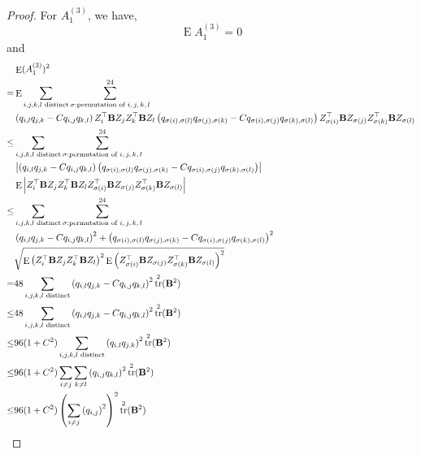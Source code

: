 \documentclass[11pt]{article}
\DeclareMathOperator{\mytr}{tr}
\DeclareMathOperator{\myE}{E}
\theoremstyle{plain}
\theoremstyle{definition}
\theoremstyle{remark}
\begin{document}
\begin{proof}
For $A_1^{(3)}$, we have,
\begin{equation*}
    \myE A_{1}^{(3)}= 0 
\end{equation*}
and
\begin{equation*}
    \begin{split}
    &\myE (A_{1}^{(3)})^2 
    \\
    =&
    \myE
    \sum_{i,j,k,l \text{ distinct}}
    \sum_{\sigma: \text{permutation of $i,j,k,l$}}^{24}
    \\
    &
\left(q_{i,l} q_{j,k} -C q_{i,j} q_{k,l}\right) Z_{i}^\top \BB Z_{j} 
Z_{k}^\top \BB Z_{l}
\left(q_{\sigma(i),\sigma(l)} q_{\sigma(j),\sigma(k)} -C q_{\sigma(i),\sigma(j)} q_{\sigma(k),\sigma(l)}\right) Z_{\sigma(i)}^\top \BB Z_{\sigma(j)} 
Z_{\sigma(k)}^\top \BB Z_{\sigma(l)}
\\
\leq &
    \sum_{i,j,k,l \text{ distinct}}
    \sum_{\sigma: \text{permutation of $i,j,k,l$}}^{24}
    \\
    &
\left|\left(q_{i,l} q_{j,k} -C q_{i,j} q_{k,l}\right) 
\left(q_{\sigma(i),\sigma(l)} q_{\sigma(j),\sigma(k)} -C q_{\sigma(i),\sigma(j)} q_{\sigma(k),\sigma(l)}\right)
\right|
\\
    &\myE
    \left|
Z_{i}^\top \BB Z_{j} 
Z_{k}^\top \BB Z_{l}
 Z_{\sigma(i)}^\top \BB Z_{\sigma(j)} 
Z_{\sigma(k)}^\top \BB Z_{\sigma(l)}
\right|
\\
\leq &
    \sum_{i,j,k,l \text{ distinct}}
    \sum_{\sigma: \text{permutation of $i,j,k,l$}}^{24}
    \\
    &
\left(q_{i,l} q_{j,k} -C q_{i,j} q_{k,l}\right)^2+ 
\left(q_{\sigma(i),\sigma(l)} q_{\sigma(j),\sigma(k)} -C q_{\sigma(i),\sigma(j)} q_{\sigma(k),\sigma(l)}\right)^2
\\
    &
    \sqrt{\myE
    \left(
Z_{i}^\top \BB Z_{j} 
Z_{k}^\top \BB Z_{l}\right)^2
\myE\left(
 Z_{\sigma(i)}^\top \BB Z_{\sigma(j)} 
Z_{\sigma(k)}^\top \BB Z_{\sigma(l)}
\right)^2
}
\\
=&
48
    \sum_{i,j,k,l \text{ distinct}}
\left(q_{i,l} q_{j,k} -C q_{i,j} q_{k,l}\right)^2
\mytr^2(\BB^2)
\\
\leq&
48
    \sum_{i,j,k,l \text{ distinct}}
\left(q_{i,l} q_{j,k} -C q_{i,j} q_{k,l}\right)^2
\mytr^2(\BB^2)
\\
\leq &
96 (1+C^2) 
    \sum_{i,j,k,l \text{ distinct}}
    \left(q_{i,l} q_{j,k}\right)^2
    \mytr^2 (\BB^2)
    \\
\leq &
96 (1+C^2) 
    \sum_{i\neq j}
    \sum_{k\neq l}
    \left(q_{i,j} q_{k,l}\right)^2
    \mytr^2 (\BB^2)
    \\
\leq &
96 (1+C^2) 
    \left(
        \sum_{i\neq j}
    \left(q_{i,j} \right)^2
\right)^2
    \mytr^2 (\BB^2)
    \end{split}
\end{equation*}


\end{proof}
\end{document}
